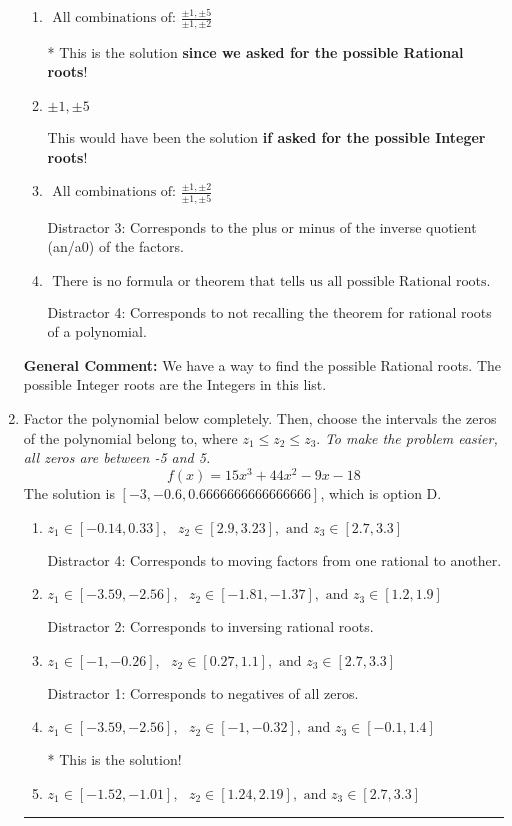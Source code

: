 \documentclass{extbook}[14pt]
\newcommand{\litem}[1]{\item #1

\rule{\textwidth}{0.4pt}}
\begin{document}
\begin{enumerate}
{\begin{enumerate}[label=\Alph*.]
 Distractor 1: Corresponds to the plus or minus factors of a1 only.
\item \( \text{ All combinations of: }\frac{\pm 1,\pm 5}{\pm 1,\pm 2} \)

* This is the solution \textbf{since we asked for the possible Rational roots}!
\item \( \pm 1,\pm 5 \)

This would have been the solution \textbf{if asked for the possible Integer roots}!
\item \( \text{ All combinations of: }\frac{\pm 1,\pm 2}{\pm 1,\pm 5} \)

 Distractor 3: Corresponds to the plus or minus of the inverse quotient (an/a0) of the factors. 
\item \( \text{ There is no formula or theorem that tells us all possible Rational roots.} \)

 Distractor 4: Corresponds to not recalling the theorem for rational roots of a polynomial.
\end{enumerate}

\textbf{General Comment:} We have a way to find the possible Rational roots. The possible Integer roots are the Integers in this list.
}
\litem{
Factor the polynomial below completely. Then, choose the intervals the zeros of the polynomial belong to, where $z_1 \leq z_2 \leq z_3$. \textit{To make the problem easier, all zeros are between -5 and 5.}
\[ f(x) = 15x^{3} +44 x^{2} -9 x -18 \]The solution is \( [-3, -0.6, 0.6666666666666666] \), which is option D.\begin{enumerate}[label=\Alph*.]
\item \( z_1 \in [-0.14, 0.33], \text{   }  z_2 \in [2.9, 3.23], \text{   and   } z_3 \in [2.7, 3.3] \)

 Distractor 4: Corresponds to moving factors from one rational to another.
\item \( z_1 \in [-3.59, -2.56], \text{   }  z_2 \in [-1.81, -1.37], \text{   and   } z_3 \in [1.2, 1.9] \)

 Distractor 2: Corresponds to inversing rational roots.
\item \( z_1 \in [-1, -0.26], \text{   }  z_2 \in [0.27, 1.1], \text{   and   } z_3 \in [2.7, 3.3] \)

 Distractor 1: Corresponds to negatives of all zeros.
\item \( z_1 \in [-3.59, -2.56], \text{   }  z_2 \in [-1, -0.32], \text{   and   } z_3 \in [-0.1, 1.4] \)

* This is the solution!
\item \( z_1 \in [-1.52, -1.01], \text{   }  z_2 \in [1.24, 2.19], \text{   and   } z_3 \in [2.7, 3.3] \)


\end{enumerate}}
\end{enumerate}
\end{document}
